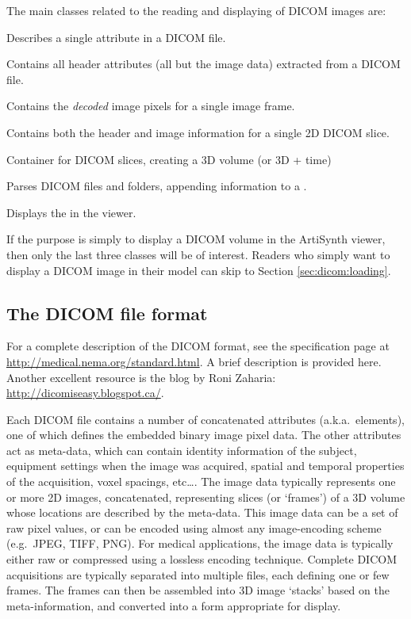 The main classes related to the reading and displaying of DICOM images are:
\begin{lstdescription}
   \item[{\protect \javaclass[maspack.dicom]{DicomElement}}] Describes a single attribute in a DICOM file.
   \item[{\protect \javaclass[maspack.dicom]{DicomHeader}}] Contains all header attributes (all but the image data) extracted from a DICOM file.
   \item[{\protect \javaclass[maspack.dicom]{DicomPixelBuffer}}] Contains the \emph{decoded} image pixels for a single image frame.
   \item[{\protect \javaclass[maspack.dicom]{DicomSlice}}] Contains both the header and image information for a single 2D DICOM slice.
   \item[{\protect \javaclass[maspack.dicom]{DicomImage}}] Container for DICOM slices, creating a 3D volume (or 3D + time)
   \item[{\protect \javaclass[maspack.dicom]{DicomReader}}] Parses DICOM files and folders, appending information to a . 
   \item[{\protect \javaclass[artisynth.core.renderables]{DicomViewer}}] Displays the  in the viewer.
\end{lstdescription}
If the purpose is simply to display a DICOM volume in the ArtiSynth viewer, then only the last three classes will be of interest.  Readers who simply want to display a DICOM image in their model can skip to Section \ref{sec:dicom:loading}.

\subsection{The DICOM file format}

For a complete description of the DICOM format, see the specification page at \url{http://medical.nema.org/standard.html}.  A brief
description is provided here.  Another excellent resource is the blog by Roni Zaharia: \url{http://dicomiseasy.blogspot.ca/}.

Each DICOM file contains a number of concatenated attributes (a.k.a.~elements), one of which defines the embedded binary image pixel data.  The other attributes act as meta-data, which can contain identity information of the subject, equipment settings when the image was acquired, spatial and temporal properties of the acquisition, voxel spacings, etc\ldots.  The image data typically represents one or more 2D images, concatenated, representing slices (or `frames') of a 3D volume whose locations are described by the meta-data.  This image data can be a set of raw pixel values, or can be encoded using almost any image-encoding scheme (e.g.~JPEG, TIFF, PNG).  For medical applications, the image data is typically either raw or compressed using a lossless encoding technique.  Complete DICOM acquisitions are typically separated into multiple files, each defining one or few frames.  The frames can then be assembled into 3D image `stacks' based on the meta-information, and converted into a form appropriate for display.

